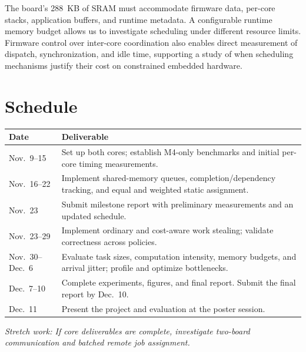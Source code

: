\documentclass[11pt]{article}
\begin{document}
The board's 288~KB of SRAM must accommodate firmware data, per-core
stacks, application buffers, and runtime metadata. A configurable
runtime memory budget allows us to investigate scheduling under
different resource limits. Firmware control over inter-core
coordination also enables direct measurement of dispatch,
synchronization, and idle time, supporting a study of when scheduling
mechanisms justify their cost on constrained embedded hardware.

\section{Schedule}

\begin{tabularx}{\linewidth}{@{}p{3.2cm}X@{}}
\toprule
\textbf{Date} & \textbf{Deliverable} \\
\midrule[0.8pt]

Nov.\ 9--15 &
Set up both cores; establish M4-only benchmarks and initial
per-core timing measurements. \\
\midrule[0.25pt]

Nov.\ 16--22 &
Implement shared-memory queues, completion/dependency tracking,
and equal and weighted static assignment. \\
\midrule[0.25pt]

Nov.\ 23 &
Submit milestone report with preliminary measurements and an
updated schedule. \\
\midrule[0.25pt]

Nov.\ 23--29 &
Implement ordinary and cost-aware work stealing; validate
correctness across policies. \\
\midrule[0.25pt]

Nov.\ 30--Dec.\ 6 &
Evaluate task sizes, computation intensity, memory budgets,
and arrival jitter; profile and optimize bottlenecks. \\
\midrule[0.25pt]

Dec.\ 7--10 &
Complete experiments, figures, and final report.
Submit the final report by Dec.\ 10. \\
\midrule[0.25pt]

Dec.\ 11 &
Present the project and evaluation at the poster session. \\

\bottomrule
\end{tabularx}

\medskip
\textit{Stretch work: If core deliverables are complete, investigate
two-board communication and batched remote job assignment.}
\end{document}
